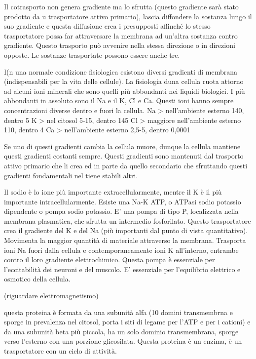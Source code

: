 \documentclass[]{article}
\begin{document}
Il cotrasporto non genera gradiente ma lo sfrutta (questo gradiente sarà
stato prodotto da u trasportatore attivo primario), lascia diffondere la
sostanza lungo il suo gradiente e questa diffusione crea i presupposti
affinché lo stesso trasportatore possa far attraversare la membrana ad
un'altra sostanza contro gradiente. Questo trasporto può avvenire nella
stessa direzione o in direzioni opposte. Le sostanze trasportate possono
essere anche tre.

I(n una normale condizione fisiologica esistono diversi gradienti di
membrana (indispensabili per la vita delle cellule). La fisiologia duna
cellula ruota attorno ad alcuni ioni minerali che sono quelli più
abbondanti nei liquidi biologici. I più abbondanti in assoluto sono il
Na e il K, Cl e Ca. Questi ioni hanno sempre concentrazioni diverse
dentro e fuori la cellula. Na \textgreater{} nell'ambiente esterno 140,
dentro 5 K \textgreater{} nel citosol 5-15, dentro 145 Cl \textgreater{}
maggiore nell'ambiente esterno 110, dentro 4 Ca \textgreater{}
nell'ambiente esterno 2,5-5, dentro 0,0001

Se uno di questi gradienti cambia la cellula muore, dunque la cellula
mantiene questi gradienti costanti sempre. Questi gradienti sono
mantenuti dal trasporto attivo primario che li crea ed in parte da
quello secondario che sfruttando questi gradienti fondamentali nel tiene
stabili altri.

Il sodio è lo ione più importante extracellularmente, mentre il K è il
più importante intracellularmente. Esiste una Na-K ATP, o ATPasi sodio
potassio dipendente o pompa sodio potassio. E' una pompa di tipo P,
localizzata nella membrana plasmatica, che sfrutta un intermedio
fosforilato. Questo trasportatore crea il gradiente del K e del Na (più
importanti dal punto di vista quantitativo). Movimenta la maggior
quantità di materiale attraverso la membrana. Trasporta ioni Na fuori
dalla cellula e contemporaneamente ioni K all'interno, entrambe contro
il loro gradiente elettrochimico. Questa pompa è essenziale per
l'eccitabilità dei neuroni e del muscolo. E' essenziale per l'equilibrio
elettrico e osmotico della cellula.

(riguardare elettromagnetismo)

questa proteina è formata da una subunità alfa (10 domini transmembrna e
sporge in prevalenza nel citosol, porta i siti di legame per l'ATP e per
i cationi) e da una subunità beta più piccola, ha un solo dominio
transmembrana, sporge verso l'esterno con una porzione glicosilata.
Questa proteina è un enzima, è un trasportatore con un ciclo di
attività.
\end{document}
